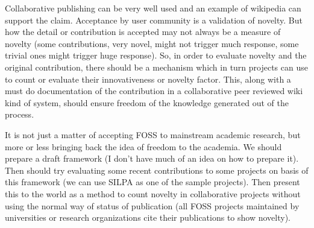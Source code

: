 Collaborative publishing can be very well used and an example of wikipedia can support 
the claim. Acceptance by user community is a validation of novelty. But how the detail
or contribution is accepted may not always be a measure of novelty
(some contributions, very novel, might not trigger much response, some
trivial ones might trigger huge response). So, in order to evaluate novelty and the
original contribution, there should be a mechanism which in turn projects
can use to count or evaluate their innovativeness or novelty factor.
This, along with a must do documentation of the contribution in a collaborative
peer reviewed wiki kind of system, should ensure freedom of the knowledge
generated out of the process.

It is not just a matter of accepting FOSS to mainstream academic research, but 
more or less bringing back the idea of freedom to the academia. We should prepare 
a draft framework (I don't have much of an idea on how to prepare it). Then should try 
evaluating some recent contributions to some projects on basis of this framework (we can 
use SILPA as one of the sample projects). Then present this to the world as a method
to count novelty in collaborative projects without using the normal way of
status of publication (all FOSS projects maintained by universities or research
organizations cite their publications to show novelty).
\newpage
